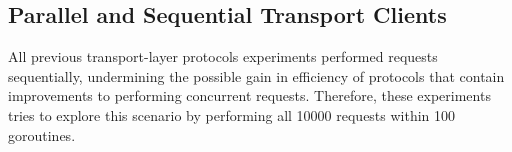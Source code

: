 \subsection{Parallel and Sequential Transport Clients}

All previous transport-layer protocols experiments performed requests sequentially, undermining the possible gain in efficiency of protocols that contain improvements to performing concurrent requests. Therefore, these experiments tries to explore this scenario by performing all 10000 requests within 100 goroutines.


\clearpage


\clearpage


\clearpage
